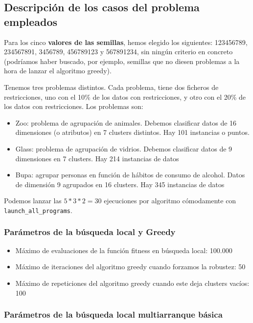 \documentclass[11pt]{article}
\begin{document}
\subsection{Descripción de los casos del problema empleados}

Para los cinco \textbf{valores de las semillas}, hemos elegido los siguientes: 123456789, 234567891, 3456789, 456789123 y 567891234, sin ningún criterio en concreto (podríamos haber buscado, por ejemplo, semillas que no diesen problemas a la hora de lanzar el algoritmo greedy).

Tenemos tres problemas distintos. Cada problema, tiene dos ficheros de restricciones, uno con el 10\% de los datos con restricciones, y otro con el 20\% de los datos con restricciones. Los problemas son:

\begin{itemize}
    \item Zoo: problema de agrupación de animales. Debemos clasificar datos de 16 dimensiones (o atributos) en 7 clusters distintos. Hay 101 instancias o puntos.
    \item Glass: problema de agrupación de vidrios. Debemos clasificar datos de 9 dimensiones en 7 clusters. Hay 214 instancias de datos
    \item Bupa: agrupar personas en función de hábitos de consumo de alcohol. Datos de dimensión 9 agrupados en 16 clusters. Hay 345 instancias de datos
\end{itemize}

Podemos lanzar las $5 * 3 * 2 = 30$ ejecuciones por algoritmo cómodamente con \lstinline{launch_all_programs}.

\subsubsection{Parámetros de la búsqueda local y Greedy}

\begin{itemize}
\item Máximo de evaluaciones de la función fitness en búsqueda local: 100.000
    \item Máximo de iteraciones del algoritmo greedy cuando forzamos la robustez: 50
    \item Máximo de repeticiones del algoritmo greedy cuando este deja clusters vacíos: 100
\end{itemize}

\subsubsection{Parámetros de la búsqueda local multiarranque básica} \label{parametros_blm}
\end{document}
